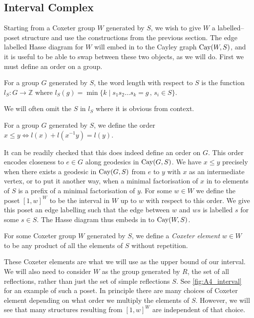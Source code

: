 \documentclass[class=article, crop=false]{standalone}
\begin{document}
\subsection{Interval Complex}
\label{sec:interval_cx}
Starting from a Coxeter group $W$ generated by $S$, we wish to give $W$ a labelled--poset structure and use the constructions from the previous section. The edge labelled Hasse diagram for $W$ will embed in to the Cayley graph $\text{Cay}(W,S)$, and it is useful to be able to swap between these two objects, as we will do. First we must define an order on a group.

\begin{definition}
    For a group $G$ generated by $S$, the word length with respect to $S$ is the function $l_S:G\to \mathbb{Z}$ where $l_S(g) = \min\{k \mid s_1s_2\ldots s_k=g \,,\, s_i \in S \}$.
\end{definition}

We will often omit the $S$ in $l_S$ where it is obvious from context.

\begin{definition}
    For a group $G$ generated by $S$, we define the order $x \leq y \iff l(x) + l(x^{-1}y) = l(y)$.
\end{definition}

It can be readily checked that this does indeed define an order on $G$. This order encodes closeness to $e \in G$ along geodesics in $\text{Cay}(G,S)$. We have $x \leq y$ precisely when there exists a geodesic in $\text{Cay}(G, S)$ from $e$ to $y$ with $x$ as an intermediate vertex, or to put it another way, when a minimal factorisation of $x$ in to elements of $S$ is a prefix of a minimal factorisation of $y$.
For some $w \in W$ we define the poset $[1,w]^W$ to be the interval in $W$ up to $w$ with respect to this order. We give this poset an edge labelling such that the edge between $w$ and $ws$ is labelled $s$ for some $s \in S$. The Hasse diagram thus embeds in to $\text{Cay}(W,S)$.

\begin{definition}
	For some Coxeter group $W$ generated by $S$, we define a \emph{Coxeter element} $w\in W$ to be any product of all the elements of $S$ without repetition.
\end{definition}

These Coxeter elements are what we will use as the upper bound of our interval. We will also need to consider $W$ as the group generated by $R$, the set of all reflections, rather than just the set of simple reflections $S$. See \cref{fig:A4_interval} for an example of such a poset. In principle there are many choices of Coxeter element depending on what order we multiply the elements of $S$. 
However, we will see that many structures resulting from $[1,w]^W$ are independent of that choice.
\end{document}
